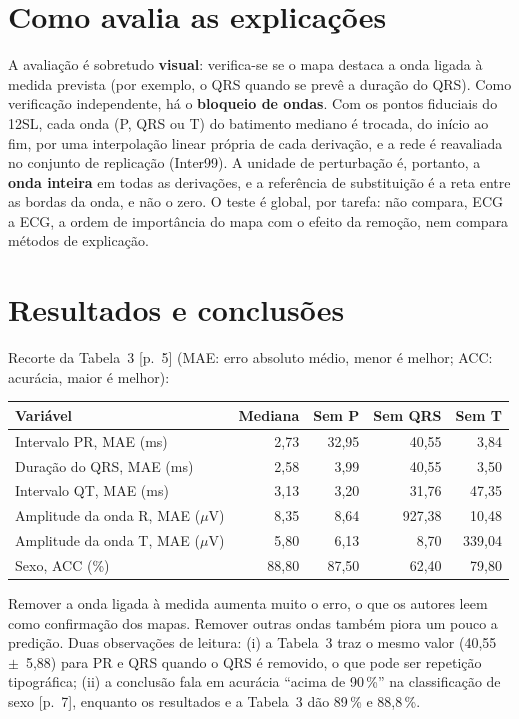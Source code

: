 \documentclass[11pt,a4paper]{article}
\begin{document}
\section{Como avalia as explicações}
A avaliação é sobretudo \textbf{visual}: verifica-se se o mapa destaca a onda ligada à medida prevista (por exemplo, o QRS quando se prevê a duração do QRS). Como verificação independente, há o \textbf{bloqueio de ondas}. Com os pontos fiduciais do 12SL, cada onda (P, QRS ou T) do batimento mediano é trocada, do início ao fim, por uma interpolação linear própria de cada derivação, e a rede é reavaliada no conjunto de replicação (Inter99). A unidade de perturbação é, portanto, a \textbf{onda inteira} em todas as derivações, e a referência de substituição é a reta entre as bordas da onda, e não o zero. O teste é global, por tarefa: não compara, ECG a ECG, a ordem de importância do mapa com o efeito da remoção, nem compara métodos de explicação.

\section{Resultados e conclusões}
Recorte da Tabela~3 [p.~5] (MAE: erro absoluto médio, menor é melhor; ACC: acurácia, maior é melhor):
\begin{center}\small
\begin{tabular}{lrrrr}
\toprule
\textbf{Variável} & \textbf{Mediana} & \textbf{Sem P} & \textbf{Sem QRS} & \textbf{Sem T} \\
\midrule
Intervalo PR, MAE (ms) & 2,73 & 32,95 & 40,55 & 3,84 \\
Duração do QRS, MAE (ms) & 2,58 & 3,99 & 40,55 & 3,50 \\
Intervalo QT, MAE (ms) & 3,13 & 3,20 & 31,76 & 47,35 \\
Amplitude da onda R, MAE ($\mu$V) & 8,35 & 8,64 & 927,38 & 10,48 \\
Amplitude da onda T, MAE ($\mu$V) & 5,80 & 6,13 & 8,70 & 339,04 \\
Sexo, ACC (\%) & 88,80 & 87,50 & 62,40 & 79,80 \\
\bottomrule
\end{tabular}
\end{center}
Remover a onda ligada à medida aumenta muito o erro, o que os autores leem como confirmação dos mapas. Remover outras ondas também piora um pouco a predição. Duas observações de leitura: (i) a Tabela~3 traz o mesmo valor (40,55~$\pm$~5,88) para PR e QRS quando o QRS é removido, o que pode ser repetição tipográfica; (ii) a conclusão fala em acurácia “acima de 90\,\%” na classificação de sexo [p.~7], enquanto os resultados e a Tabela~3 dão 89\,\% e 88,8\,\%.
\end{document}
